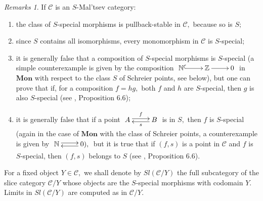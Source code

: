 \documentclass[11pt]{amsart}
\theoremstyle{plain}
\theoremstyle{definition}
\theoremstyle{remark}
\newtheorem{remarks}[subsubsection]{Remarks}
\begin{document}
\begin{remarks}
\label{rmks:s-special}
If $\mathcal{C}$ is an $S$-Mal'tsev category:
\begin{enumerate}
\item the class of $S$-special morphisms is pullback-stable in $\mathcal{C},$ because so is $S;$
\item since $S$ contains all isomorphisms, every monomorphism in $\mathcal{C}$ is $S$-special;
\item it is generally false that a composition of $S$-special morphisms is $S$-special (a simple counterexample is given by the composition $\xymatrix{{\mathbb{N}} \ar@{^(->}[r] &{\mathbb{Z}} \ar[r] &0}$ in $\mathbf{Mon}$ with respect to the class $S$ of Schreier points, see below), but one can prove that if, for a composition $f=hg,$ both $f$ and $h$ are $S$-special, then $g$ is also $S$-special (see \cite{partial}, Proposition 6.6);
\item it is generally false that if a point $\xymatrix{A \ar@<.5ex>[r]^-f &B \ar@<.5ex>[l]^-s}$ is in $S,$ then $f$ is $S$-special (again in the case of $\mathbf{Mon}$ with the class of Schreier points, a counterexample is given by $\xymatrix{\mathbb{N} \ar@<.5ex>[r] &{0),} \ar@<.5ex>[l]}$ but it is true that if $(f,s)$ is a point in $\mathcal{C}$ and $f$ is $S$-special, then $(f,s)$ belongs to $S$ (see \cite{S-protomodular}, Proposition 6.6).
\end{enumerate}
\end{remarks}
For a fixed object $Y\in\mathcal{C},$ we shall denote by $Sl(\mathcal{C}/Y)$ the full subcategory of the slice category $\mathcal{C}/Y$ whose objects are the $S$-special morphisms with codomain $Y.$ Limits in $Sl(\mathcal{C}/Y)$ are computed as in $\mathcal{C}/Y.$
\end{document}
